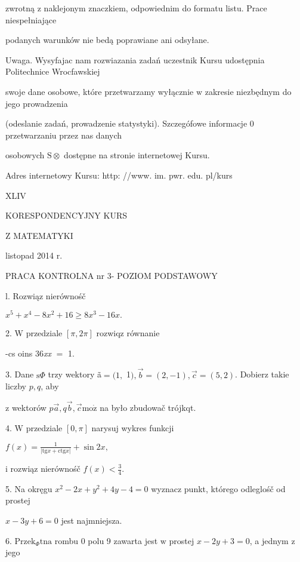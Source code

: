 \documentclass[a4paper,12pt]{article}
\begin{document}
zwrotną $\mathrm{z}$ naklejonym znaczkiem, odpowiednim do formatu listu. Prace niespełniające

podanych warunków nie bedą poprawiane ani odsyłane.

Uwaga. Wysyfajac nam rozwiazania zadań uczestnik Kursu udostępnia Politechnice Wrocfawskiej

swoje dane osobowe, które przetwarzamy wyłącznie $\mathrm{w}$ zakresie niezbędnym do jego prowadzenia

(odeslanie zadań, prowadzenie statystyki). Szczegófowe informacje $0$ przetwarzaniu przez nas danych

osobowych $\mathrm{S}\otimes$ dostępne na stronie internetowej Kursu.

Adres internetowy Kursu: http: //www. im. pwr. edu. pl/kurs







XLIV

KORESPONDENCYJNY KURS

Z MATEMATYKI

listopad 2014 r.

PRACA KONTROLNA nr 3- POZIOM PODSTAWOWY

l. Rozwiąz nierównośč

$x^{5}+x^{4}-8x^{2}+16\geq 8x^{3}-16x.$

2. $\mathrm{W}$ przedziale $[\pi,2\pi]$ rozwiqz równanie

-cs  oins 36{\it xx} $=$ 1.

3. Dane $\mathrm{s}\Phi$ trzy wektory ã$= (1,$ 1$), \vec{b}= (2,-1), \vec{c}= (5,2)$. Dobierz takie liczby $p, q$, aby

$\mathrm{z}$ wektorów $p\vec{a}, q\vec{b}, \vec{c}\mathrm{m}\mathrm{o}\dot{\mathrm{z}}$ na było zbudowač trójkqt.

4. $\mathrm{W}$ przedziale $[0,\pi]$ narysuj wykres funkcji

$f(x)=\displaystyle \frac{1}{|\mathrm{t}\mathrm{g}x+\mathrm{c}\mathrm{t}\mathrm{g}x|}+\sin 2x,$

$\mathrm{i}$ rozwiąz nierównośč $f(x)<\displaystyle \frac{3}{4}.$

5. Na okręgu $x^{2}-2x+y^{2}+4y-4 = 0$ wyznacz punkt, którego odleglośč od prostej

$x-3y+6=0$ jest najmniejsza.

6. $\mathrm{P}\mathrm{r}\mathrm{z}\mathrm{e}\mathrm{k}_{\Phi}\mathrm{t}\mathrm{n}\mathrm{a}$ rombu $0$ polu 9 zawarta jest $\mathrm{w}$ prostej $x-2y+3 = 0$, a jednym $\mathrm{z}$ jego
\end{document}
